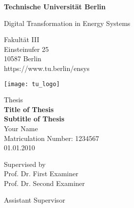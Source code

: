 \thispagestyle{empty}
\begin{center}

    \vspace*{1.4cm}
    {\LARGE \textbf{Technische Universität Berlin}}

    \vspace{0.5cm}

    {\large Digital Transformation in Energy Systems\\[1mm]}

    Fakultät III\\
    Einsteinufer 25\\
    10587 Berlin\\
    https://www.tu.berlin/ensys\\

    \vspace*{1cm}

    \texttt{[image: tu\_logo]}

    \vspace*{1.0cm}

    {\LARGE Thesis}\\

    \vspace{1.0cm}
    {\LARGE \textbf{Title of Thesis}}\\
    \vspace*{0.3cm}
    {\LARGE \textbf{Subtitle of Thesis}}\\
    \vspace*{1.0cm}
    {\LARGE Your Name}
    \\
    \vspace*{0.5cm}
    Matriculation Number: 1234567\\
    01.01.2010\\ %
    \vspace*{1.0cm}

    Supervised by\\
    Prof. Dr. First Examiner\\
    Prof. Dr. Second Examiner

    \vspace*{0.5cm}
    Assistant Supervisor\\
    \vspace{3cm}


\end{center}

